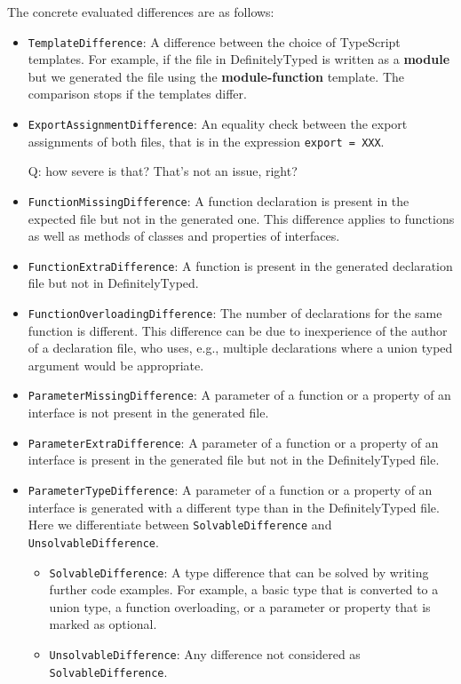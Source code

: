 \documentclass[english,cleveref,autoref,submission]{programming}
\newenvironment{changethis}{%
  \begin{tcolorbox}[breakable,notitle,boxrule=0pt,colback=blue!20,colframe=blue!20]}{%
  \end{tcolorbox}}
\begin{document}
The concrete evaluated differences are as follows:
\begin{itemize}
  \item \texttt{TemplateDifference}: A difference between the choice of TypeScript
    templates. For example, if the file in DefinitelyTyped is written as a \textbf{module}
    but we generated the file using the \textbf{module-function} template. The comparison
    stops if the templates differ. 
  \item \texttt{ExportAssignmentDifference}: An equality check between the export
    assignments of both files, that is in the expression
    \lstinline{export = XXX}.
    \begin{changethis}
      Q: how severe is that? That's not an issue, right?
    \end{changethis}
  \item \texttt{FunctionMissingDifference}: A function declaration is present in the expected
    file but not in the generated one. This difference applies to functions as well as methods of classes
    and properties of interfaces. 
  \item \texttt{FunctionExtraDifference}: A function is present in the generated declaration file but not in DefinitelyTyped.
  \item \texttt{FunctionOverloadingDifference}: The number of declarations for the same
    function is different. This difference can be due to inexperience of the author of a
    declaration file, who uses, e.g., multiple declarations where a union typed argument
    would be appropriate.
  \item \texttt{ParameterMissingDifference}: A parameter of a function or a property of an interface is not present in the generated file.
  \item \texttt{ParameterExtraDifference}: A parameter of a function or a property of an
    interface is present in the generated file but not in the DefinitelyTyped file. 
  \item \texttt{ParameterTypeDifference}: A parameter of a function or a property of an interface is generated with a different type than in the DefinitelyTyped file. Here we differentiate between \texttt{SolvableDifference} and \texttt{UnsolvableDifference}.
  \begin{itemize}
    \item \texttt{SolvableDifference}: A type difference that can be solved by writing
      further code examples. For example, a basic type that is converted to a union type,
      a function overloading, or a parameter or property that is marked as optional. 
    \item \texttt{UnsolvableDifference}: Any difference not considered as \texttt{SolvableDifference}.
  \end{itemize}
\end{itemize}
\end{document}
